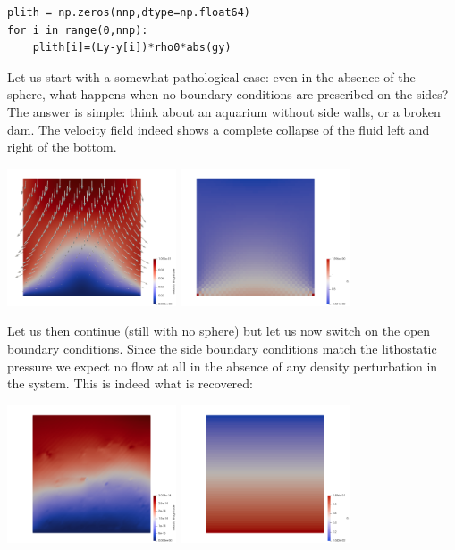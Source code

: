 \begin{lstlisting}
plith = np.zeros(nnp,dtype=np.float64)
for i in range(0,nnp):
    plith[i]=(Ly-y[i])*rho0*abs(gy)
\end{lstlisting}


Let us start with a somewhat pathological case: even in the absence of the 
sphere, what happens when no 
boundary conditions are prescribed on the sides? The answer is simple: 
think about an aquarium without side walls, or a broken dam. The velocity field 
indeed shows a complete collapse of the fluid left and right of the bottom.

\begin{center}
\includegraphics[width=5cm]{python_codes/fieldstone_29/results/nobc/vel}
\includegraphics[width=5cm]{python_codes/fieldstone_29/results/nobc/p}
\end{center}

Let us then continue (still with no sphere) but let us now switch on the open 
boundary conditions. Since the side boundary conditions match the lithostatic 
pressure we expect no flow at all in the absence of any density perturbation
in the system. This is indeed what is recovered:

\begin{center}
\includegraphics[width=5cm]{python_codes/fieldstone_29/results/no_sphere_openbc/vel}
\includegraphics[width=5cm]{python_codes/fieldstone_29/results/no_sphere_openbc/p}
\end{center}
 
